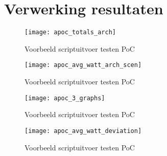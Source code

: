 \section{Verwerking resultaten}

\begin{figure}[h!]
    \texttt{[image: apoc\_totals\_arch]}
    \centering
    \caption{Voorbeeld scriptuitvoer testen PoC}
    \label{apoc_totals_arch}
\end{figure}

\begin{figure}[h!]
    \texttt{[image: apoc\_avg\_watt\_arch\_scen]}
    \centering
    \caption{Voorbeeld scriptuitvoer testen PoC}
    \label{apoc_avg_watt_arch_scen}
\end{figure}

\begin{figure}[h!]
    \texttt{[image: apoc\_3\_graphs]}
    \centering
    \caption{Voorbeeld scriptuitvoer testen PoC}
    \label{apoc_3_graphs}
\end{figure}

\begin{figure}[h!]
    \texttt{[image: apoc\_avg\_watt\_deviation]}
    \centering
    \caption{Voorbeeld scriptuitvoer testen PoC}
    \label{apoc_avg_watt_deviation}
\end{figure}

